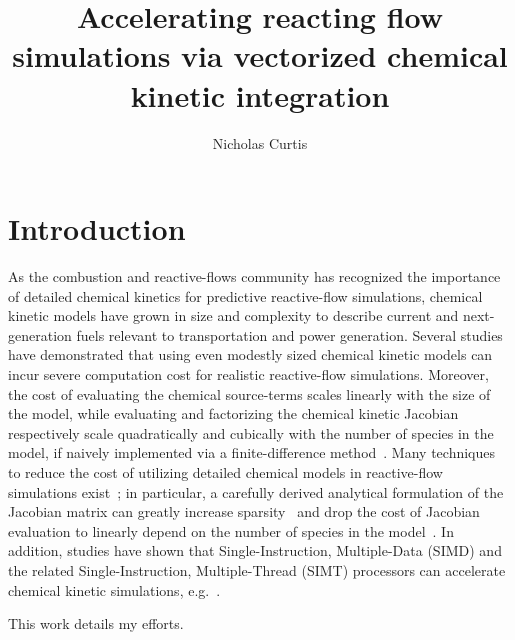\documentclass[a4paper,10pt]{article}
\title{Accelerating reacting flow simulations via vectorized chemical kinetic integration}
\author{Nicholas Curtis}
\begin{document}
\maketitle

\section*{Introduction}
As the combustion and reactive-flows community has recognized the importance of detailed chemical kinetics for predictive reactive-flow simulations, chemical kinetic models have grown in size and complexity to describe current and next-generation fuels relevant to transportation and power generation.
Several studies~\cite{Huang20091814,Bottone2012,Moiz2016123} have demonstrated that using even modestly sized chemical kinetic models can incur severe computation cost for realistic reactive-flow simulations.
Moreover, the cost of evaluating the chemical source-terms scales linearly with the size of the model, while evaluating and factorizing the chemical kinetic Jacobian respectively scale quadratically and cubically with the number of species in the model, if naively implemented via a finite-difference method~\cite{LU2009192}.
Many techniques to reduce the cost of utilizing detailed chemical models in reactive-flow simulations exist~\cite{LU2009192}; in particular, a carefully derived analytical formulation of the Jacobian matrix can greatly increase sparsity~\cite{SCHWER2002270} and drop the cost of Jacobian evaluation to linearly depend on the number of species in the model~\cite{LU2009192}.
In addition, studies have shown that Single-Instruction, Multiple-Data (SIMD) and the related Single-Instruction, Multiple-Thread (SIMT) processors can accelerate chemical kinetic simulations, e.g.~\cite{STONE201818}.

This work details my efforts.
\end{document}
